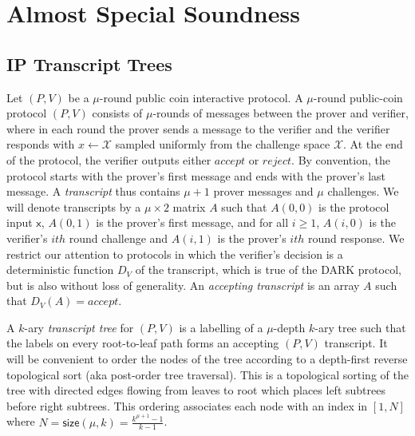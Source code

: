 \documentclass{article}
\theoremstyle{definition}
\begin{document}
\section{Almost Special Soundness}


\subsection{IP Transcript Trees}\label{sec:IPtrees}

Let $(P,V)$ be a $\mu$-round public coin interactive protocol. A $\mu$-round public-coin protocol $(P,V)$ consists of $\mu$-rounds of messages between the prover and verifier, where in each round the prover sends a message to the verifier and the verifier responds with $x \leftarrow \mathcal{X}$ sampled uniformly from the challenge space $\mathcal{X}$. At the end of the protocol, the verifier outputs either $accept$ or $reject$. By convention, the protocol starts with the prover's first message and ends with the prover's last message. A \emph{transcript} thus contains $\mu+1$ prover messages and $\mu$ challenges. We will denote transcripts by a $\mu \times 2$ matrix $A$ such that $A(0,0)$ is the protocol input $\mathsf{x}$, $A(0, 1)$ is the prover's first message, and for all $i ≥ 1$, $A(i, 0)$ is the verifier's $ith$ round challenge and $A(i,1)$ is the prover's $ith$ round response.  We restrict our attention to protocols in which the verifier's decision is a deterministic function $D_V$ of the transcript, which is true of the DARK protocol, but is also without loss of generality. An \emph{accepting transcript} is an array $A$ such that $D_V(A) = accept$. 

A $k$-ary \emph{transcript tree} for $(P,V)$ is a labelling of a $\mu$-depth $k$-ary tree such that the labels on every root-to-leaf path forms an accepting $(P,V)$ transcript.  It will be convenient to order the nodes of the tree according to a depth-first reverse topological sort (aka post-order tree traversal). This is a topological sorting of the tree with directed edges flowing from leaves to root which places left subtrees before right subtrees. This ordering associates each node with an index in $[1,N]$ where $N = \textsf{size}(\mu, k) = \frac{k^{\mu+1} - 1}{k-1}$. 
\end{document}
